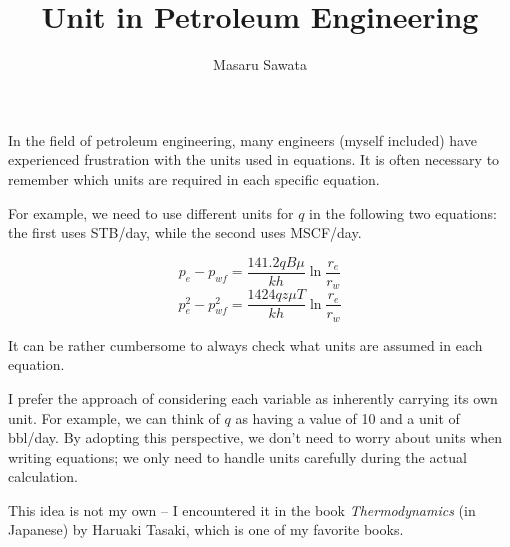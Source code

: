 \documentclass[letterpaper, 12pt]{article}
\title{Unit in Petroleum Engineering}
\author{Masaru Sawata}
\theoremstyle{custom}
\begin{document}
\maketitle
In the field of petroleum engineering, many engineers (myself included) have experienced frustration with the units used in equations.
It is often necessary to remember which units are required in each specific equation.

For example, we need to use different units for $q$ in the following two equations: the first uses STB/day, while the second uses MSCF/day.

\begin{equation*}
  p_e - p_{wf} = \frac{141.2 qB\mu}{kh} \ln \frac{r_e}{r_w}
\end{equation*}
\begin{equation*}
  p_e^2 - p_{wf}^2 = \frac{1424 q z \mu T}{kh} \ln \frac{r_e}{r_w}
\end{equation*}

It can be rather cumbersome to always check what units are assumed in each equation.

I prefer the approach of considering each variable as inherently carrying its own unit.
For example, we can think of $q$ as having a value of 10 and a unit of bbl/day.
By adopting this perspective, we don't need to worry about units when writing equations;
we only need to handle units carefully during the actual calculation.

This idea is not my own -- I encountered it in the book \textit{Thermodynamics} (in Japanese) by Haruaki Tasaki, which is one of my favorite books.
\end{document}
